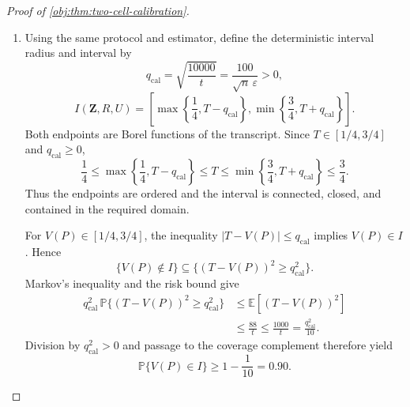 \documentclass[11pt]{article}
\begin{document}
\begin{proof}[Proof of \cref{obj:thm:two-cell-calibration}]
\begin{enumerate}
Projection toward this interval reduces squared error:
\[
(T-V(P))^2
\le(\widetilde V_{\mathrm{cal}}-V(P))^2.
\]
Indeed, if \(\widetilde V_{\mathrm{cal}}\le1/4\), then
\(T=1/4\le V(P)\); if \(\widetilde V_{\mathrm{cal}}\ge3/4\), then
\(V(P)\le T=3/4\); and inside the interval \(T=\widetilde V_{\mathrm{cal}}\).

The reverse triangle inequality gives
\[
\bigl(|\widehat\tau_j|-|\tau_j(P)|\bigr)^2
\le(\widehat\tau_j-\tau_j(P))^2
\qquad(j\in[2]).
\]
Applying the squared-sum inequality first to the baseline and contrast contributions and then to the two contrast contributions proves the pointwise bound
\[
(T-V(P))^2
\le
2(\widehat B_{\mathrm{cal}}-B(P))^2
+\frac{
(\widehat\tau_1-\tau_1(P))^2+
(\widehat\tau_2-\tau_2(P))^2
}{4}.
\]
Integrating and substituting the component bounds gives
\[
\mathbb E[(T-V(P))^2]
\le
\frac1{2m_{\mathrm{bin}}\delta^2}
+\frac2{m_{\mathrm{vec}}\delta^2}.
\]

The half split satisfies
\[
m_{\mathrm{bin}}\ge\frac n3,
\qquad
m_{\mathrm{vec}}\ge\frac n2.
\]
For the first inequality, even \(n\) gives \(m_{\mathrm{bin}}=n/2\); odd \(n\ge3\) gives
\(m_{\mathrm{bin}}=(n-1)/2\ge n/3\).
The second follows from \(m_{\mathrm{bin}}\le n/2\).
Together with \(\delta\ge\varepsilon/4\), these bounds yield the numerical calibration
\[
\begin{aligned}
\mathbb E[(T-V(P))^2]
&\le
\frac1{2(n/3)\delta^2}
+\frac2{(n/2)\delta^2}\\
&=\frac{88}{n(4\delta)^2}
\le\frac{88}{n\varepsilon^2}
=\frac{88}{t}
\le\frac{1000}{t}.
\end{aligned}
\]

\item
Using the same protocol and estimator, define the deterministic interval radius and interval by
\[
q_{\mathrm{cal}}
=\sqrt{\frac{10000}{t}}
=\frac{100}{\sqrt n\,\varepsilon}>0,
\]
\[
I(\mathbf Z,R,U)
=
\left[
\max\left\{\frac14,T-q_{\mathrm{cal}}\right\},
\min\left\{\frac34,T+q_{\mathrm{cal}}\right\}
\right].
\]
Both endpoints are Borel functions of the transcript. Since
\(T\in[1/4,3/4]\) and \(q_{\mathrm{cal}}\ge0\),
\[
\frac14
\le\max\left\{\frac14,T-q_{\mathrm{cal}}\right\}
\le T
\le\min\left\{\frac34,T+q_{\mathrm{cal}}\right\}
\le\frac34.
\]
Thus the endpoints are ordered and the interval is connected, closed, and contained in the required domain.

For \(V(P)\in[1/4,3/4]\), the inequality
\(|T-V(P)|\le q_{\mathrm{cal}}\) implies \(V(P)\in I\). Hence
\[
\{V(P)\notin I\}
\subseteq
\{(T-V(P))^2\ge q_{\mathrm{cal}}^2\}.
\]
Markov's inequality and the risk bound give
\[
\begin{aligned}
q_{\mathrm{cal}}^2\,
\mathbb P\{(T-V(P))^2\ge q_{\mathrm{cal}}^2\}
&\le\mathbb E[(T-V(P))^2]\\
&\le\frac{88}{t}
\le\frac{1000}{t}
=\frac{q_{\mathrm{cal}}^2}{10}.
\end{aligned}
\]
Division by \(q_{\mathrm{cal}}^2>0\) and passage to the coverage complement therefore yield
\[
\mathbb P\{V(P)\in I\}\ge1-\frac1{10}=0.90.
\]


\end{enumerate}
\end{proof}
\end{document}
